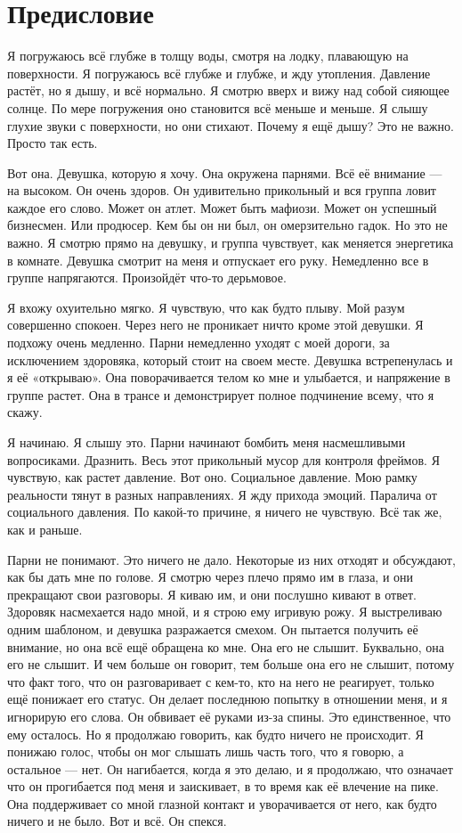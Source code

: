 \chapter{Предисловие}

Я погружаюсь всё глубже в толщу воды, смотря на лодку, плавающую на поверхности. Я погружаюсь всё глубже и глубже, и жду утопления. Давление растёт, но я дышу, и всё нормально. Я смотрю вверх и вижу над собой сияющее солнце. По мере погружения оно становится всё меньше и меньше. Я слышу глухие звуки с поверхности, но они стихают. Почему я ещё дышу? Это не важно. Просто так есть.

Вот она. Девушка, которую я хочу. Она окружена парнями. Всё её внимание --- на высоком. Он очень здоров. Он удивительно прикольный и вся группа ловит каждое его слово. Может он атлет. Может быть мафиози. Может он успешный бизнесмен. Или продюсер. Кем бы он ни был, он омерзительно гадок. Но это не важно. Я смотрю прямо на девушку, и группа чувствует, как меняется энергетика в комнате. Девушка смотрит на меня и отпускает его руку. Немедленно все в группе напрягаются. Произойдёт что-то дерьмовое.

Я вхожу охуительно мягко. Я чувствую, что как будто плыву. Мой разум совершенно спокоен. Через него не проникает ничто кроме этой девушки. Я подхожу очень медленно. Парни немедленно уходят с моей дороги, за исключением здоровяка, который стоит на своем месте. Девушка встрепенулась и я её «открываю». Она поворачивается телом ко мне и улыбается, и напряжение в группе растет. Она в трансе и демонстрирует полное подчинение всему, что я скажу.

Я начинаю. Я слышу это. Парни начинают бомбить меня насмешливыми вопросиками. Дразнить. Весь этот прикольный мусор для контроля фреймов. Я чувствую, как растет давление. Вот оно. Социальное давление. Мою рамку реальности тянут в разных направлениях. Я жду прихода эмоций. Паралича от социального давления. По какой-то причине, я ничего не чувствую. Всё так же, как и раньше.

Парни не понимают. Это ничего не дало. Некоторые из них отходят и обсуждают, как бы дать мне по голове. Я смотрю через плечо прямо им в глаза, и они прекращают свои разговоры. Я киваю им, и они послушно кивают в ответ. Здоровяк насмехается надо мной, и я строю ему игривую рожу. Я выстреливаю одним шаблоном, и девушка разражается смехом. Он пытается получить её внимание, но она всё ещё обращена ко мне. Она его не слышит. Буквально, она его не слышит. И чем больше он говорит, тем больше она его не слышит, потому что факт того, что он разговаривает с кем-то, кто на него не реагирует, только ещё понижает его статус. Он делает последнюю попытку в отношении меня, и я игнорирую его слова. Он обвивает её руками из-за спины. Это единственное, что ему осталось. Но я продолжаю говорить, как будто ничего не происходит. Я понижаю голос, чтобы он мог слышать лишь часть того, что я говорю, а остальное --- нет. Он нагибается, когда я это делаю, и я продолжаю, что означает что он прогибается под меня и заискивает, в то время как её влечение на пике. Она поддерживает со мной глазной контакт и уворачивается от него, как будто ничего и не было. Вот и всё. Он спекся.

